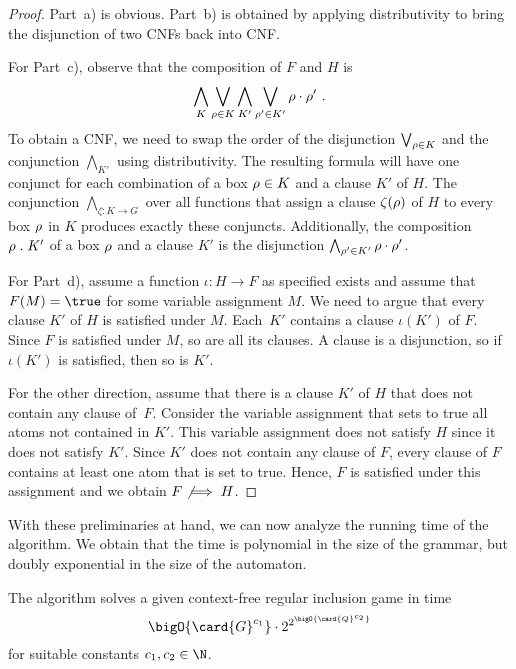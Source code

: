 \documentclass[../../diss.tex]{subfiles}
\begin{document}
\begin{proof}
    Part~a) is obvious.
    Part~b) is obtained by applying distributivity to bring the disjunction of two CNFs back into CNF.\@

    For Part~c), observe that the composition of $F$ and $H$ is
    \[
        \bigwedge_{K} \bigvee_{\tbox \in K}
        \bigwedge_{K'} \bigvee_{\tbox' \in K'}
            \tbox \cdot \tbox'
        \ .
    \]
    To obtain a CNF, we need to swap the order of the disjunction $\bigvee_{\tbox \in K}$ and the conjunction $\bigwedge_{K'}$ using distributivity.
    The resulting formula will have one conjunct for each combination of a box $\tbox \in K$ and a clause $K'$ of $H$.
    The conjunction $\bigwedge_{\zeta \colon K \to G}$ over all functions that assign a clause $\zeta(\tbox)$ of $H$ to every box $\tbox$ in $K$ produces exactly these conjuncts.
    Additionally, the composition $\tbox \comp K'$ of a box $\tbox$ and a clause $K'$ is the disjunction $\bigwedge_{\tbox' \in K'} \tbox \cdot \tbox'$.

    For Part~d), assume a function $\iota \colon H \to F$ as specified exists and assume that $F(M) = \true$ for some variable assignment $M$.
    We need to argue that every clause $K'$ of $H$ is satisfied under $M$.
    Each~$K'$ contains a clause $\iota(K')$ of $F$.
    Since $F$ is satisfied under $M$, so are all its clauses.
    A clause is a disjunction, so if $\iota(K')$ is satisfied, then so is $K'$.

    For the other direction, assume that there is a clause $K'$ of $H$ that does not contain any clause of~$F$.
    Consider the variable assignment that sets to true all atoms not contained in $K'$.
    This variable assignment does not satisfy $H$ since it does not satisfy $K'$.
    Since $K'$ does not contain any clause of $F$, every clause of $F$ contains at least one atom that is set to true.
    Hence, $F$ is satisfied under this assignment and we obtain $F \not\implies H$.
\end{proof}

With these preliminaries at hand, we can now analyze the running time of the algorithm.
We obtain that the time is polynomial in the size of the grammar, but doubly exponential in the size of the automaton.

\begin{proposition}%
\label{Proposition:CFGamesComplexityMembership}%
    The algorithm solves a given context-free regular inclusion game in time
    \[
        \bigO{\card{G}^{c_1}} \cdot 2^{2^{\bigO{\card{Q}^{c_2}}}}
    \]
    for suitable constants $c_1, c_2 \in \N$.
\end{proposition}
\end{document}
